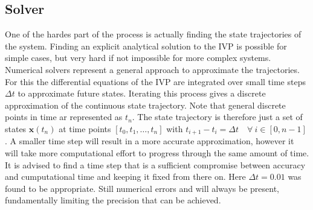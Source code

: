{
}

\subsection{Solver}

One of the hardes part of the process is actually finding the state trajectories of the system. 
Finding an explicit analytical solution to the IVP is possible for simple cases, but very hard if not impossible for more complex systems. Numerical solvers represent a general approach to approximate the trajectories. For this the differential equations of the IVP are integrated over small time steps $\Delta t$ to approximate future states. Iterating this process gives a discrete approximation of the continuous state trajectory. Note that general discrete points in time ar represented as $t_n$.
The state trajectory is therefore just a set of states $\mathbf{x}(t_n)$ at time points $[t_0,t_1,\ldots, t_n]$ with $t_{i+1}-t_{i} = \Delta t\quad \forall\ i \in [0,n-1]\ $.
A smaller time step will result in a more accurate approximation, however it will take more computational effort to progress through the same amount of time.
It is advised to find a time step that is a sufficient compromise between accuracy and cumputational time and keeping it fixed from there on. Here $\Delta t = 0.01$ was found to be appropriate. 
Still numerical errors and will always be present, fundamentally limiting the precision that can be achieved. 

